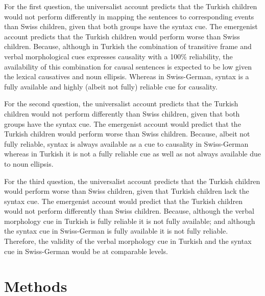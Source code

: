 \documentclass[man]{apa6}
\begin{document}
For the first question, the universalist account predicts that the
Turkish children would not perform differently in mapping the sentences
to corresponding events than Swiss children, given that both groups have
the syntax cue. The emergenist account predicts that the Turkish
children would perform worse than Swiss children. Because, although in
Turkish the combination of transitive frame and verbal morphological
cues expresses causality with a 100\% reliability, the availability of
this combination for causal sentences is expected to be low given the
lexical causatives and noun ellipsis. Whereas in Swiss-German, syntax is
a fully available and highly (albeit not fully) reliable cue for
causality.

For the second question, the universalist account predicts that the
Turkish children would not perform differently than Swiss children,
given that both groups have the syntax cue. The emergenist account would
predict that the Turkish children would perform worse than Swiss
children. Because, albeit not fully reliable, syntax is always available
as a cue to causality in Swiss-German whereas in Turkish it is not a
fully reliable cue as well as not always available due to noun ellipsis.

For the third question, the universalist account predicts that the
Turkish children would perform worse than Swiss children, given that
Turkish children lack the syntax cue. The emergenist account would
predict that the Turkish children would not perform differently than
Swiss children. Because, although the verbal morphology cue in Turkish
is fully reliable it is not fully available; and although the syntax cue
in Swiss-German is fully available it is not fully reliable. Therefore,
the validity of the verbal morphology cue in Turkish and the syntax cue
in Swiss-German would be at comparable levels.

\section{Methods}\label{methods}
\end{document}
